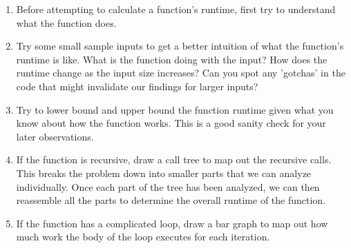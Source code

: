 \begin{enumerate}
\item Before attempting to calculate a function's runtime, first try to understand what the function does.
\item Try some small sample inputs to get a better intuition of what the function's runtime is like. What is the function doing with the input? How does the runtime change as the input size increases? Can you spot any 'gotchas' in the code that might invalidate our findings for larger inputs?
\item Try to lower bound and upper bound the function runtime given what you know about how the function works. This is a good sanity check for your later observations.
\item If the function is recursive, draw a call tree to map out the recursive calls. This breaks the problem down into smaller parts that we can analyze individually. Once each part of the tree has been analyzed, we can then reassemble all the parts to determine the overall runtime of the function.
\item If the function has a complicated loop, draw a bar graph to map out how much work the body of the loop executes for each iteration.
\end{enumerate}

